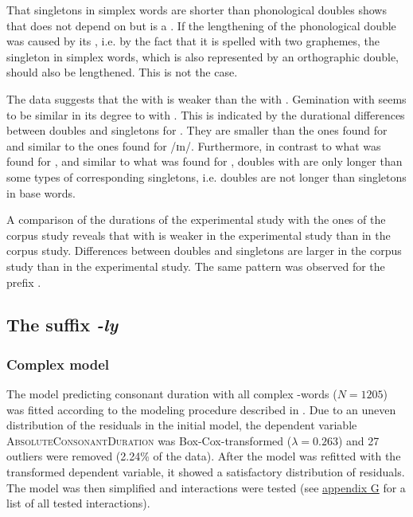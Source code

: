 That singletons in simplex words are shorter than phonological doubles shows that  does not depend on  but is a . If the lengthening of the phonological double was caused by its , i.e. by the fact that it is spelled with two graphemes, the singleton in simplex words, which is also represented by an orthographic double, should also be lengthened. This is not the case. 


The data suggests that the  with  is weaker than the  with . Gemination with  seems to be similar in its degree to  with . 
This is indicated by the durational differences between doubles and singletons for . They are smaller than the ones found for  and similar to the ones found for /ɪn/. 
Furthermore, in contrast to what was found for , and similar to what was found for , doubles with  are only longer than some types of corresponding singletons, i.e. doubles are not longer than singletons in base words.



A comparison of the durations of the experimental study with the ones of the corpus study reveals that  with  is weaker in the experimental study than in the corpus study. Differences between doubles and singletons are larger in the corpus study than in the experimental study. The same pattern was observed for the prefix .


\subsection{The suffix \textit{-ly} }

\subsubsection{Complex model}

The model predicting consonant duration with all complex -words ($N=1205$) was fitted according to the modeling procedure described in . Due to an uneven distribution of the residuals in the initial model, the dependent variable \textsc{AbsoluteConsonantDuration} was Box-Cox-transformed ($\lambda = 0.263$) and 27 outliers were removed (2.24\% of the data). 
After the model was refitted with the transformed dependent variable, it showed a satisfactory distribution of residuals. The model was then simplified and interactions were tested (see \hyperref[Appendix G Summaries of tested interactions in experimental study]{appendix G} for a list of all tested interactions). 

